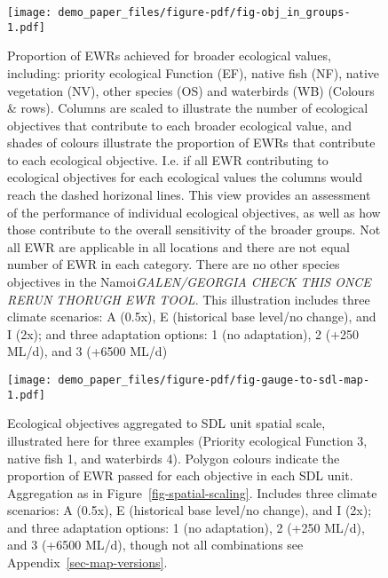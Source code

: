 \documentclass[
  number]{elsarticle}
\begin{document}
\begin{figure}

{\centering \texttt{[image: demo\_paper\_files/figure-pdf/fig-obj\_in\_groups-1.pdf]}

}

\caption{\label{fig-obj_in_groups}Proportion of EWRs achieved for
broader ecological values, including: priority ecological Function (EF),
native fish (NF), native vegetation (NV), other species (OS) and
waterbirds (WB) (Colours \& rows). Columns are scaled to illustrate the
number of ecological objectives that contribute to each broader
ecological value, and shades of colours illustrate the proportion of
EWRs that contribute to each ecological objective. I.e. if all EWR
contributing to ecological objectives for each ecological values the
columns would reach the dashed horizonal lines. This view provides an
assessment of the performance of individual ecological objectives, as
well as how those contribute to the overall sensitivity of the broader
groups. Not all EWR are applicable in all locations and there are not
equal number of EWR in each category. There are no other species
objectives in the Namoi\emph{GALEN/GEORGIA CHECK THIS ONCE RERUN THORUGH
EWR TOOL}. This illustration includes three climate scenarios: A (0.5x),
E (historical base level/no change), and I (2x); and three adaptation
options: 1 (no adaptation), 2 (+250 ML/d), and 3 (+6500 ML/d)}

\end{figure}

\begin{figure}

{\centering \texttt{[image: demo\_paper\_files/figure-pdf/fig-gauge-to-sdl-map-1.pdf]}

}

\caption{\label{fig-gauge-to-sdl-map}Ecological objectives aggregated to
SDL unit spatial scale, illustrated here for three examples (Priority
ecological Function 3, native fish 1, and waterbirds 4). Polygon colours
indicate the proportion of EWR passed for each objective in each SDL
unit. Aggregation as in Figure~\ref{fig-spatial-scaling}. Includes three
climate scenarios: A (0.5x), E (historical base level/no change), and I
(2x); and three adaptation options: 1 (no adaptation), 2 (+250 ML/d),
and 3 (+6500 ML/d), though not all combinations see
Appendix~\ref{sec-map-versions}.}

\end{figure}
\end{document}
